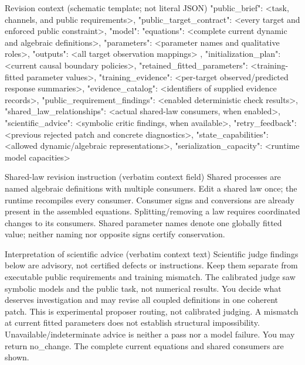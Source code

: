 \begin{afpromptbox}{Revision context (schematic template; not literal JSON)}
{
  "public_brief": <task, channels, and public requirements>,
  "public_target_contract": <every target and enforced public constraint>,
  "model": {
    "equations": <complete current dynamic and algebraic definitions>,
    "parameters": <parameter names and qualitative roles>,
    "outputs": <all target observation mappings>
  },
  "initialization_plan": <current causal boundary policies>,
  "retained_fitted_parameters": <training-fitted parameter values>,
  "training_evidence": <per-target observed/predicted response summaries>,
  "evidence_catalog": <identifiers of supplied evidence records>,
  "public_requirement_findings": <enabled deterministic check results>,
  "shared_law_relationships": <actual shared-law consumers, when enabled>,
  "scientific_advice": <symbolic critic findings, when available>,
  "retry_feedback": <previous rejected patch and concrete diagnostics>,
  "state_capabilities": <allowed dynamic/algebraic representations>,
  "serialization_capacity": <runtime model capacities>
}
\end{afpromptbox}

\begin{afpromptbox}{Shared-law revision instruction (verbatim context field)}
Shared processes are named algebraic definitions with multiple consumers.
Edit a shared law once; the runtime recompiles every consumer. Consumer
signs and conversions are already present in the assembled equations.
Splitting/removing a law requires coordinated changes to its consumers.
Shared parameter names denote one globally fitted value; neither naming nor
opposite signs certify conservation.
\end{afpromptbox}

\begin{afpromptbox}{Interpretation of scientific advice (verbatim context text)}
Scientific judge findings below are advisory, not certified defects or
instructions. Keep them separate from executable public requirements and
training mismatch. The calibrated judge saw symbolic models and the public
task, not numerical results. You decide what deserves investigation and may
revise all coupled definitions in one coherent patch. This is experimental
proposer routing, not calibrated judging. A mismatch at current fitted
parameters does not establish structural impossibility.
Unavailable/indeterminate advice is neither a pass nor a model failure. You
may return no_change. The complete current equations and shared consumers
are shown.
\end{afpromptbox}


